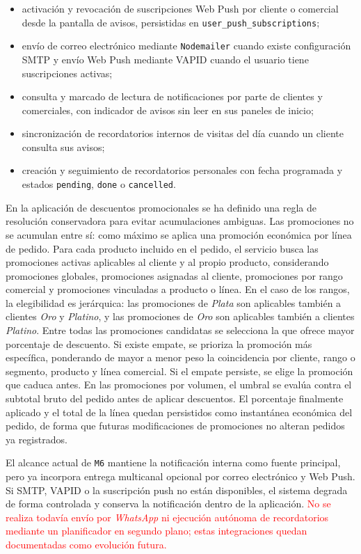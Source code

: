 \begin{itemize}
    \item activación y revocación de suscripciones Web Push por cliente o comercial desde la pantalla de avisos, persistidas en \texttt{user\_push\_subscriptions};
    \item envío de correo electrónico mediante \texttt{Nodemailer} cuando existe configuración SMTP y envío Web Push mediante VAPID cuando el usuario tiene suscripciones activas;
    \item consulta y marcado de lectura de notificaciones por parte de clientes y comerciales, con indicador de avisos sin leer en sus paneles de inicio;
    \item sincronización de recordatorios internos de visitas del día cuando un cliente consulta sus avisos;
    \item creación y seguimiento de recordatorios personales con fecha programada y estados \texttt{pending}, \texttt{done} o \texttt{cancelled}.
\end{itemize}

En la aplicación de descuentos promocionales se ha definido una regla de resolución conservadora para evitar acumulaciones ambiguas. Las promociones no se acumulan entre sí: como máximo se aplica una promoción económica por línea de pedido. Para cada producto incluido en el pedido, el servicio busca las promociones activas aplicables al cliente y al propio producto, considerando promociones globales, promociones asignadas al cliente, promociones por rango comercial y promociones vinculadas a producto o línea. En el caso de los rangos, la elegibilidad es jerárquica: las promociones de \textit{Plata} son aplicables también a clientes \textit{Oro} y \textit{Platino}, y las promociones de \textit{Oro} son aplicables también a clientes \textit{Platino}. Entre todas las promociones candidatas se selecciona la que ofrece mayor porcentaje de descuento. Si existe empate, se prioriza la promoción más específica, ponderando de mayor a menor peso la coincidencia por cliente, rango o segmento, producto y línea comercial. Si el empate persiste, se elige la promoción que caduca antes. En las promociones por volumen, el umbral se evalúa contra el subtotal bruto del pedido antes de aplicar descuentos. El porcentaje finalmente aplicado y el total de la línea quedan persistidos como instantánea económica del pedido, de forma que futuras modificaciones de promociones no alteran pedidos ya registrados.

El alcance actual de \texttt{M6} mantiene la notificación interna como fuente principal, pero ya incorpora entrega multicanal opcional por correo electrónico y Web Push. Si SMTP, VAPID o la suscripción push no están disponibles, el sistema degrada de forma controlada y conserva la notificación dentro de la aplicación. \textcolor{red}{No se realiza todavía envío por \textit{WhatsApp} ni ejecución autónoma de recordatorios mediante un planificador en segundo plano; estas integraciones quedan documentadas como evolución futura.}

